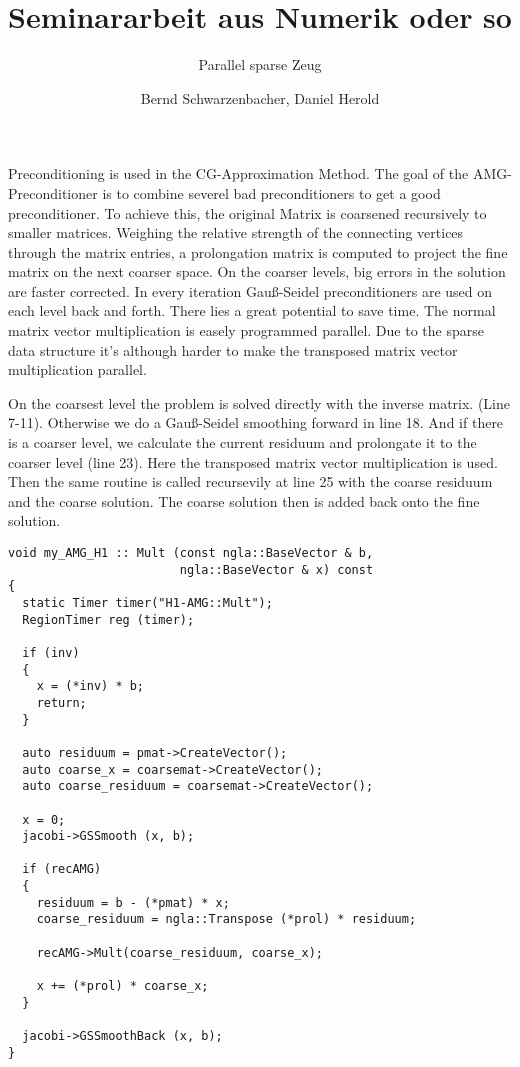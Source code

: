 \documentclass[a4paper,11pt]{scrartcl}
\title{Seminararbeit aus Numerik oder so}
\subtitle{Parallel sparse Zeug}
\author{Bernd Schwarzenbacher, Daniel Herold}
\begin{document}
\maketitle
\tableofcontents

\pagebreak

Preconditioning is used in the CG-Approximation Method. The goal of the
AMG-Preconditioner is to combine severel bad preconditioners to
get a good preconditioner. To achieve this, the original Matrix is coarsened
recursively to smaller matrices. Weighing the relative strength of the
connecting vertices through the matrix entries, a prolongation matrix is
computed to project the fine matrix on the next coarser space. On the coarser
levels, big errors in the solution are faster corrected.
In every iteration Gauß-Seidel preconditioners are used on each level back and
forth. There lies a great potential to save time.
The normal matrix vector multiplication is easely programmed parallel. Due to
the sparse data structure it's although harder to make the transposed matrix
vector multiplication parallel.

On the coarsest level the problem is solved directly with the inverse matrix.
(Line 7-11).
Otherwise we do a Gauß-Seidel smoothing forward in line 18.
And if there is a coarser level, we calculate the current residuum and
prolongate it to the coarser level (line 23). Here the transposed
matrix vector multiplication is used. Then the same routine is called
recursevily at line 25 with the coarse residuum and the coarse solution. The
coarse solution then is added back onto the fine solution.

\begin{lstlisting}
void my_AMG_H1 :: Mult (const ngla::BaseVector & b,
                        ngla::BaseVector & x) const
{
  static Timer timer("H1-AMG::Mult");
  RegionTimer reg (timer);

  if (inv)
  {
    x = (*inv) * b;
    return;
  }

  auto residuum = pmat->CreateVector();
  auto coarse_x = coarsemat->CreateVector();
  auto coarse_residuum = coarsemat->CreateVector();

  x = 0;
  jacobi->GSSmooth (x, b);

  if (recAMG)
  {
    residuum = b - (*pmat) * x;
    coarse_residuum = ngla::Transpose (*prol) * residuum;

    recAMG->Mult(coarse_residuum, coarse_x);

    x += (*prol) * coarse_x;
  }

  jacobi->GSSmoothBack (x, b);
}
\end{lstlisting}
\end{document}
